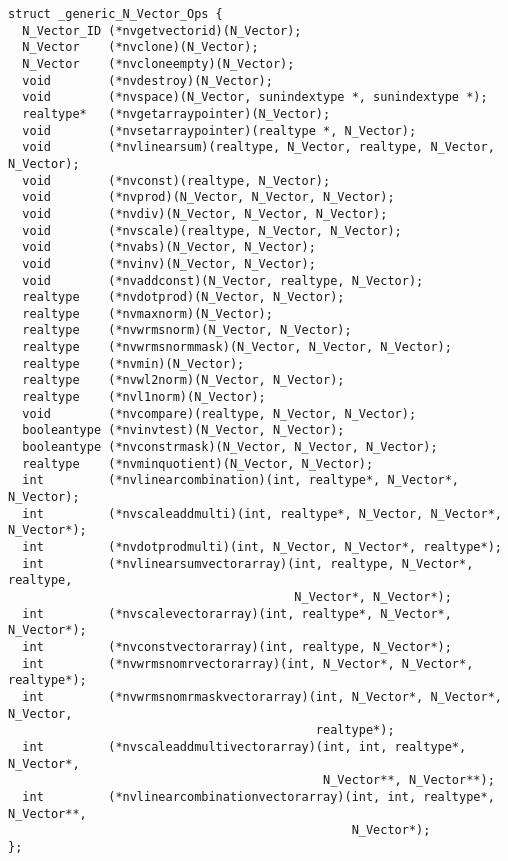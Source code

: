 \begin{verbatim}
struct _generic_N_Vector_Ops {
  N_Vector_ID (*nvgetvectorid)(N_Vector);
  N_Vector    (*nvclone)(N_Vector);
  N_Vector    (*nvcloneempty)(N_Vector);
  void        (*nvdestroy)(N_Vector);
  void        (*nvspace)(N_Vector, sunindextype *, sunindextype *);
  realtype*   (*nvgetarraypointer)(N_Vector);
  void        (*nvsetarraypointer)(realtype *, N_Vector);
  void        (*nvlinearsum)(realtype, N_Vector, realtype, N_Vector, N_Vector); 
  void        (*nvconst)(realtype, N_Vector);
  void        (*nvprod)(N_Vector, N_Vector, N_Vector);
  void        (*nvdiv)(N_Vector, N_Vector, N_Vector);
  void        (*nvscale)(realtype, N_Vector, N_Vector);
  void        (*nvabs)(N_Vector, N_Vector);
  void        (*nvinv)(N_Vector, N_Vector);
  void        (*nvaddconst)(N_Vector, realtype, N_Vector);
  realtype    (*nvdotprod)(N_Vector, N_Vector);
  realtype    (*nvmaxnorm)(N_Vector);
  realtype    (*nvwrmsnorm)(N_Vector, N_Vector);
  realtype    (*nvwrmsnormmask)(N_Vector, N_Vector, N_Vector);
  realtype    (*nvmin)(N_Vector);
  realtype    (*nvwl2norm)(N_Vector, N_Vector);
  realtype    (*nvl1norm)(N_Vector);
  void        (*nvcompare)(realtype, N_Vector, N_Vector);
  booleantype (*nvinvtest)(N_Vector, N_Vector);
  booleantype (*nvconstrmask)(N_Vector, N_Vector, N_Vector);
  realtype    (*nvminquotient)(N_Vector, N_Vector);
  int         (*nvlinearcombination)(int, realtype*, N_Vector*, N_Vector);
  int         (*nvscaleaddmulti)(int, realtype*, N_Vector, N_Vector*, N_Vector*);
  int         (*nvdotprodmulti)(int, N_Vector, N_Vector*, realtype*);
  int         (*nvlinearsumvectorarray)(int, realtype, N_Vector*, realtype,
                                        N_Vector*, N_Vector*);
  int         (*nvscalevectorarray)(int, realtype*, N_Vector*, N_Vector*);
  int         (*nvconstvectorarray)(int, realtype, N_Vector*);
  int         (*nvwrmsnomrvectorarray)(int, N_Vector*, N_Vector*, realtype*);
  int         (*nvwrmsnomrmaskvectorarray)(int, N_Vector*, N_Vector*, N_Vector,
                                           realtype*);
  int         (*nvscaleaddmultivectorarray)(int, int, realtype*, N_Vector*,
                                            N_Vector**, N_Vector**);
  int         (*nvlinearcombinationvectorarray)(int, int, realtype*, N_Vector**,
                                                N_Vector*);
};
\end{verbatim}




